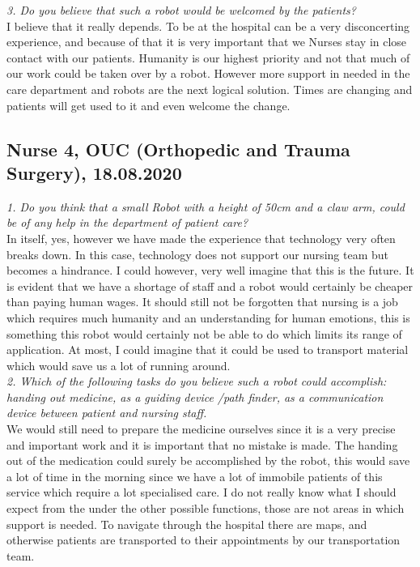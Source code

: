 \documentclass[plainarticle,zihtitle,english,final,hyperref,utf8]{zihpub}
\begin{document}
\begin{appendices}
\newline
\textit{3. Do you believe that such a robot would be welcomed by the patients?}\\
\newline
I believe that it really depends. To be at the hospital can be a very disconcerting experience, and because of that it is very important that we Nurses stay in close contact with our patients. Humanity is our highest priority and not that much of our work could be taken over by a robot. However more support in needed in the care department and robots are the next logical solution. Times are changing and patients will get used to it and even welcome the change. 
\subsection{Nurse 4, OUC (Orthopedic and Trauma Surgery), 18.08.2020}
\textit{1. Do you think that a small Robot with a height of 50cm and a claw arm, could be of any help in the department of patient care?}\\
\newline
In itself, yes, however we have made the experience that technology very often breaks down. In this case, technology does not support our nursing team but becomes a hindrance. I could however, very well imagine that this is the future. It is evident that we have a shortage of staff and a robot would certainly be cheaper than paying human wages. It should still not be forgotten that nursing is a job which requires much humanity and an understanding for human emotions, this is something this robot would certainly not be able to do which limits its range of application. At most, I could imagine that it could be used to transport material which would save us a lot of running around.\\
\newline
\textit{2. Which of the following tasks do you believe such a robot could accomplish: handing out medicine, as a guiding device /path finder, as a communication device between patient and nursing staff.}\\
\newline
We would still need to prepare the medicine ourselves since it is a very precise and important work and it is important that no mistake is made. The handing out of the medication could surely be accomplished by the robot, this would save a lot of time in the morning since we have a lot of immobile patients of this service which require a lot specialised care. I do not really know what I should expect from the under the other possible functions, those are not areas in which support is needed. To navigate through the hospital there are maps, and otherwise patients are transported to their appointments by our transportation team.\\

\end{appendices}
\end{document}

